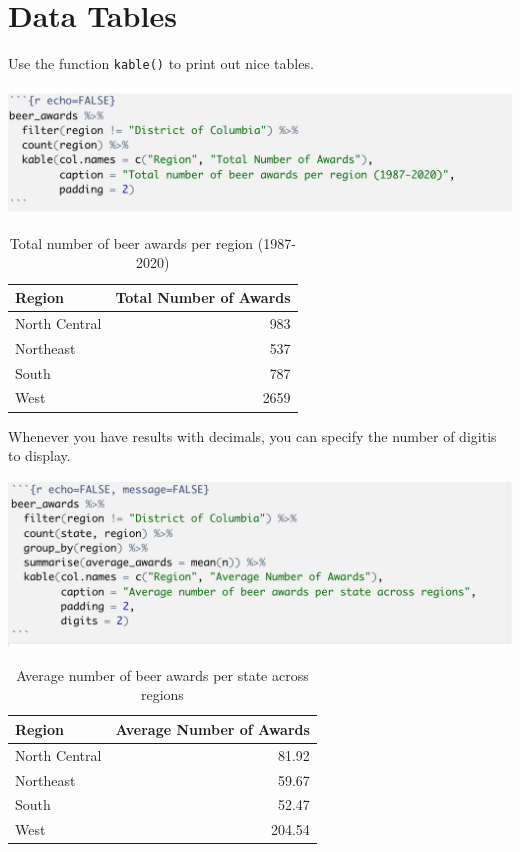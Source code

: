 \documentclass[
]{book}
\begin{document}
\hypertarget{data-tables}{%
\section{Data Tables}\label{data-tables}}

Use the function \texttt{kable()} to print out nice tables.

\includegraphics[width=20.06in]{images/nice_table_01}

\begin{table}

\caption{\label{tab:unnamed-chunk-196}Total number of beer awards per region (1987-2020)}
\centering
\begin{tabular}[t]{l|r}
\hline
Region & Total Number of Awards\\
\hline
North Central & 983\\
\hline
Northeast & 537\\
\hline
South & 787\\
\hline
West & 2659\\
\hline
\end{tabular}
\end{table}

Whenever you have results with decimals, you can specify the number of digitis to display.

\includegraphics[width=20.31in]{images/nice_table_02}

\begin{table}

\caption{\label{tab:unnamed-chunk-198}Average number of beer awards per state across regions}
\centering
\begin{tabular}[t]{l|r}
\hline
Region & Average Number of Awards\\
\hline
North Central & 81.92\\
\hline
Northeast & 59.67\\
\hline
South & 52.47\\
\hline
West & 204.54\\
\hline
\end{tabular}
\end{table}
\end{document}
